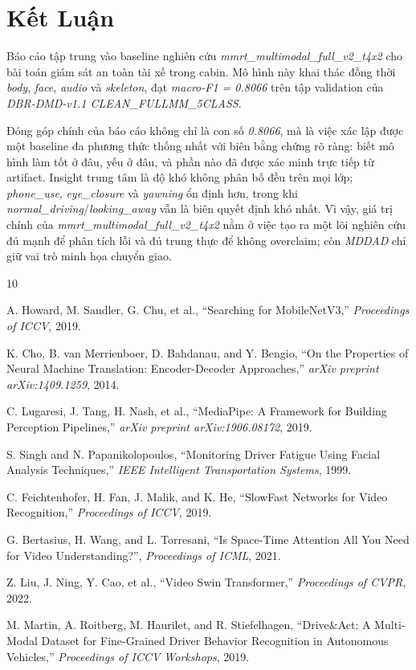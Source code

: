 \documentclass[conference,a4paper]{IEEEtran}
\begin{document}
\section[Ket Luan]{Kết Luận}
Báo cáo tập trung vào baseline nghiên cứu \textit{mmrt\_multimodal\_full\_v2\_t4x2} cho bài toán giám sát an toàn tài xế trong cabin. Mô hình này khai thác đồng thời \textit{body}, \textit{face}, \textit{audio} và \textit{skeleton}, đạt \textit{macro-F1 = 0.8066} trên tập validation của \textit{DBR-DMD-v1.1 CLEAN\_FULLMM\_5CLASS}.

Đóng góp chính của báo cáo không chỉ là con số \textit{0.8066}, mà là việc xác lập được một baseline đa phương thức thống nhất với biên bằng chứng rõ ràng: biết mô hình làm tốt ở đâu, yếu ở đâu, và phần nào đã được xác minh trực tiếp từ artifact. Insight trung tâm là độ khó không phân bố đều trên mọi lớp; \textit{phone\_use}, \textit{eye\_closure} và \textit{yawning} ổn định hơn, trong khi \textit{normal\_driving}/\textit{looking\_away} vẫn là biên quyết định khó nhất. Vì vậy, giá trị chính của \textit{mmrt\_multimodal\_full\_v2\_t4x2} nằm ở việc tạo ra một lõi nghiên cứu đủ mạnh để phân tích lỗi và đủ trung thực để không overclaim; còn \textit{MDDAD} chỉ giữ vai trò minh họa chuyển giao.

\begin{thebibliography}{10}
\small

A. Howard, M. Sandler, G. Chu, et al.,
``Searching for MobileNetV3,''
\textit{Proceedings of ICCV}, 2019.

K. Cho, B. van Merrienboer, D. Bahdanau, and Y. Bengio,
``On the Properties of Neural Machine Translation: Encoder-Decoder Approaches,''
\textit{arXiv preprint arXiv:1409.1259}, 2014.

C. Lugaresi, J. Tang, H. Nash, et al.,
``MediaPipe: A Framework for Building Perception Pipelines,''
\textit{arXiv preprint arXiv:1906.08172}, 2019.

S. Singh and N. Papanikolopoulos,
``Monitoring Driver Fatigue Using Facial Analysis Techniques,''
\textit{IEEE Intelligent Transportation Systems}, 1999.

C. Feichtenhofer, H. Fan, J. Malik, and K. He,
``SlowFast Networks for Video Recognition,''
\textit{Proceedings of ICCV}, 2019.

G. Bertasius, H. Wang, and L. Torresani,
``Is Space-Time Attention All You Need for Video Understanding?'',
\textit{Proceedings of ICML}, 2021.

Z. Liu, J. Ning, Y. Cao, et al.,
``Video Swin Transformer,''
\textit{Proceedings of CVPR}, 2022.

M. Martin, A. Roitberg, M. Haurilet, and R. Stiefelhagen,
``Drive\&Act: A Multi-Modal Dataset for Fine-Grained Driver Behavior Recognition in Autonomous Vehicles,''
\textit{Proceedings of ICCV Workshops}, 2019.

\end{thebibliography}
\end{document}
